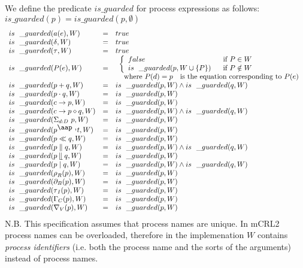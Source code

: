 \documentclass{article}
\begin{document}
We define the predicate $is\_guarded$ for process expressions as follows: $%
is\_guarded(p)=is\_guarded(p,\emptyset )$%
\[
\begin{array}{lll}
is\_guarded(a(e),W) & = & true \\ 
is\_guarded(\delta ,W) & = & true \\ 
is\_guarded(\tau ,W) & = & true \\ 
is\_guarded(P(e),W) & = & 
\begin{array}{l}
\left\{ 
\begin{array}{ll}
false & \text{if }P\in W \\ 
is\_guarded(p,W\cup \{P\}) & \text{if }P\notin W%
\end{array}%
\right.  \\ 
\text{where }P(d)=p\text{ is the equation corresponding to }P(e)%
\end{array}
\\ 
is\_guarded(p+q,W) & = & is\_guarded(p,W)\wedge is\_guarded(q,W) \\ 
is\_guarded(p\cdot q,W) & = & is\_guarded(p,W) \\ 
is\_guarded(c\rightarrow p,W) & = & is\_guarded(p,W) \\ 
is\_guarded(c\rightarrow p\diamond q,W) & = & is\_guarded(p,W)\wedge
is\_guarded(q,W) \\ 
is\_guarded(\Sigma _{d:D}\ p,W) & = & is\_guarded(p,W) \\ 
is\_guarded(p^{\mathbin{\mbox{\aap ,}}}t,W) & = & is\_guarded(p,W) \\ 
is\_guarded(p\ll q,W) & = & is\_guarded(p,W) \\ 
is\_guarded(p\parallel q,W) & = & is\_guarded(p,W)\wedge is\_guarded(q,W) \\ 
is\_guarded(p\mathbin{\mathrel{\llfloor}}q,W) & = & is\_guarded(p,W) \\ 
is\_guarded(p\mid q,W) & = & is\_guarded(p,W)\wedge is\_guarded(q,W) \\ 
is\_guarded(\rho _{R}(p),W) & = & is\_guarded(p,W) \\ 
is\_guarded(\partial _{B}(p),W) & = & is\_guarded(p,W) \\ 
is\_guarded(\tau _{I}(p),W) & = & is\_guarded(p,W) \\ 
is\_guarded(\Gamma _{C}(p),W) & = & is\_guarded(p,W) \\ 
is\_guarded(\nabla _{V}(p),W) & = & is\_guarded(p,W)%
\end{array}%
\]%
\newline
N.B. This specification assumes that process names are unique. In mCRL2
process names can be overloaded, therefore in the implemenation $W$
contains \emph{process identifiers} (i.e. both the process name and the
sorts of the arguments) instead of process names.
\end{document}
